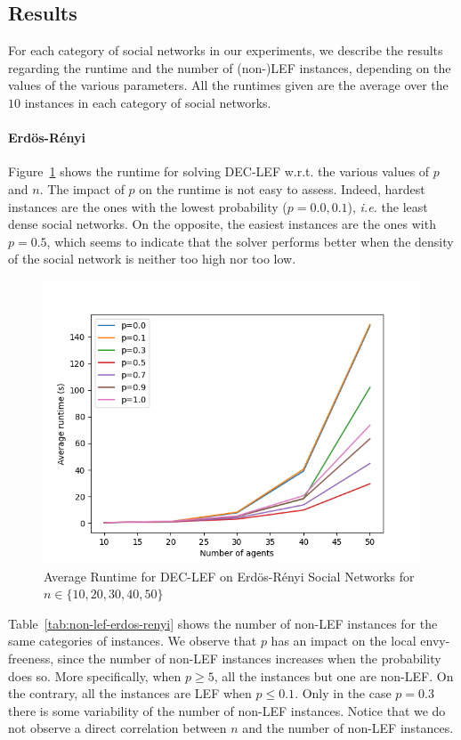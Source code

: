 \documentclass{article}
\begin{document}
\subsection{Results}
For each category of social networks in our experiments, we describe the results regarding the runtime and the number of (non-)LEF instances, depending on the values of the various parameters. All the runtimes given are the average over the $10$ instances in each category of social networks.

\paragraph{Erd\"os-R\'enyi} Figure~\ref{fig:runtime-erdos-renyi} shows the runtime for solving DEC-LEF w.r.t. the various values of  $p$ and $n$. The impact of $p$ on the runtime is not easy to assess. Indeed, hardest instances are the ones with the lowest probability ($p = 0.0, 0.1$), {\em i.e.} the least dense social networks. On the opposite, the easiest instances are the ones with $p=0.5$, which seems to indicate that the solver performs better when the density of the social network is neither too high nor too low. 

\begin{figure}[htb]
\centering
\includegraphics[width=0.45\linewidth]{results-runtime-ER.png}
\caption{Average Runtime for DEC-LEF on Erd\"os-R\'enyi Social Networks for $n \in \{10,20,30,40,50\}$\label{fig:runtime-erdos-renyi}}
\end{figure}

Table~\ref{tab:non-lef-erdos-renyi} shows the number of non-LEF instances for the same categories of instances. We observe that $p$ has an impact on the local envy-freeness, since the number of non-LEF instances increases when the probability does so. More specifically, when $p \geq 5$, all the instances but one are non-LEF. On the contrary, all the instances are LEF when $p \leq 0.1$. Only in the case $p=0.3$ there is some variability of the number of non-LEF instances. Notice that we do not observe a direct correlation between $n$ and the number of non-LEF instances.
\end{document}
